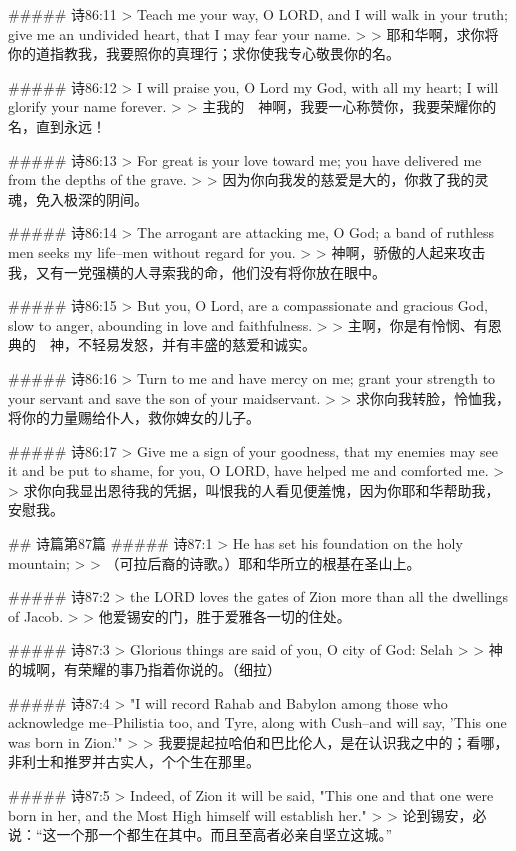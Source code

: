 ##### 诗86:11
> Teach me your way, O LORD, and I will walk in your truth; give me an undivided heart, that I may fear your name.
>
> 耶和华啊，求你将你的道指教我，我要照你的真理行；求你使我专心敬畏你的名。


##### 诗86:12
> I will praise you, O Lord my God, with all my heart; I will glorify your name forever.
>
> 主我的　神啊，我要一心称赞你，我要荣耀你的名，直到永远！


##### 诗86:13
> For great is your love toward me; you have delivered me from the depths of the grave.
>
> 因为你向我发的慈爱是大的，你救了我的灵魂，免入极深的阴间。


##### 诗86:14
> The arrogant are attacking me, O God; a band of ruthless men seeks my life--men without regard for you.
>
> 神啊，骄傲的人起来攻击我，又有一党强横的人寻索我的命，他们没有将你放在眼中。


##### 诗86:15
> But you, O Lord, are a compassionate and gracious God, slow to anger, abounding in love and faithfulness.
>
> 主啊，你是有怜悯、有恩典的　神，不轻易发怒，并有丰盛的慈爱和诚实。


##### 诗86:16
> Turn to me and have mercy on me; grant your strength to your servant and save the son of your maidservant.
>
> 求你向我转脸，怜恤我，将你的力量赐给仆人，救你婢女的儿子。


##### 诗86:17
> Give me a sign of your goodness, that my enemies may see it and be put to shame, for you, O LORD, have helped me and comforted me.
>
> 求你向我显出恩待我的凭据，叫恨我的人看见便羞愧，因为你耶和华帮助我，安慰我。


## 诗篇第87篇
##### 诗87:1
> He has set his foundation on the holy mountain;
>
> （可拉后裔的诗歌。）耶和华所立的根基在圣山上。


##### 诗87:2
> the LORD loves the gates of Zion more than all the dwellings of Jacob.
>
> 他爱锡安的门，胜于爱雅各一切的住处。


##### 诗87:3
> Glorious things are said of you, O city of God: Selah
>
> 神的城啊，有荣耀的事乃指着你说的。（细拉）


##### 诗87:4
> "I will record Rahab and Babylon among those who acknowledge me--Philistia too, and Tyre, along with Cush--and will say, 'This one was born in Zion.'"
>
> 我要提起拉哈伯和巴比伦人，是在认识我之中的；看哪，非利士和推罗并古实人，个个生在那里。


##### 诗87:5
> Indeed, of Zion it will be said, "This one and that one were born in her, and the Most High himself will establish her."
>
> 论到锡安，必说：“这一个那一个都生在其中。而且至高者必亲自坚立这城。”


